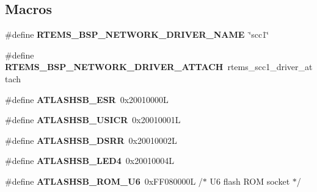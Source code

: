 \subsection*{Macros}
\begin{DoxyCompactItemize}
\item 
\mbox{\label{group__RTEMSBSPsM68kGen68360_ga86d4f9aa98431100692e31068070a8df}} 
\#define {\bfseries R\+T\+E\+M\+S\+\_\+\+B\+S\+P\+\_\+\+N\+E\+T\+W\+O\+R\+K\+\_\+\+D\+R\+I\+V\+E\+R\+\_\+\+N\+A\+ME}~\char`\"{}scc1\char`\"{}
\item 
\mbox{\label{group__RTEMSBSPsM68kGen68360_gadde0d66aef9442971dde465292ac14e6}} 
\#define {\bfseries R\+T\+E\+M\+S\+\_\+\+B\+S\+P\+\_\+\+N\+E\+T\+W\+O\+R\+K\+\_\+\+D\+R\+I\+V\+E\+R\+\_\+\+A\+T\+T\+A\+CH}~rtems\+\_\+scc1\+\_\+driver\+\_\+attach
\item 
\mbox{\label{group__RTEMSBSPsM68kGen68360_gae9f9fe3274ac9cbce6f6284b09e3a9e2}} 
\#define {\bfseries A\+T\+L\+A\+S\+H\+S\+B\+\_\+\+E\+SR}~0x20010000L
\item 
\mbox{\label{group__RTEMSBSPsM68kGen68360_ga575a4998366f8838fc64f051addac159}} 
\#define {\bfseries A\+T\+L\+A\+S\+H\+S\+B\+\_\+\+U\+S\+I\+CR}~0x20010001L
\item 
\mbox{\label{group__RTEMSBSPsM68kGen68360_ga026af8218eb77de54dd5ff25a1ff4cde}} 
\#define {\bfseries A\+T\+L\+A\+S\+H\+S\+B\+\_\+\+D\+S\+RR}~0x20010002L
\item 
\mbox{\label{group__RTEMSBSPsM68kGen68360_gada6c91398d2f8ef8c4481bb7e20f513b}} 
\#define {\bfseries A\+T\+L\+A\+S\+H\+S\+B\+\_\+\+L\+E\+D4}~0x20010004L
\item 
\mbox{\label{group__RTEMSBSPsM68kGen68360_ga13101aa27f6a17a391b97aeeef7efe4c}} 
\#define {\bfseries A\+T\+L\+A\+S\+H\+S\+B\+\_\+\+R\+O\+M\+\_\+\+U6}~0x\+F\+F080000\+L	/$\ast$ U6 flash R\+O\+M socket $\ast$/
\end{DoxyCompactItemize}
